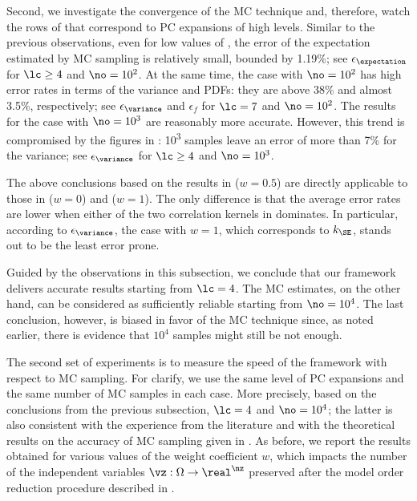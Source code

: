 Second, we investigate the convergence of the \ac{MC} technique and, therefore,
watch the rows of  that correspond to \ac{PC}
expansions of high levels. Similar to the previous observations, even for low
values of \no, the error of the expectation estimated by \ac{MC} sampling is
relatively small, bounded by 1.19\%; see $\epsilon_{\expectation}$ for $\lc
\geq 4$ and $\no = 10^2$. At the same time, the case with $\no = 10^2$ has high
error rates in terms of the variance and \acp{PDF}: they are above 38\% and
almost 3.5\%, respectively; see $\epsilon_{\variance}$ and $\epsilon_f$ for
$\lc = 7$ and $\no = 10^2$. The results for the case with $\no = 10^3$ are
reasonably more accurate. However, this trend is compromised by the figures in
: 10\textsuperscript{3} samples leave an error of more
than 7\% for the variance; see $\epsilon_{\variance}$ for $\lc \geq 4$ and $\no
= 10^3$.

The above conclusions based on the results in  ($w =
0.5$) are directly applicable to those in  ($w = 0$) and
 ($w = 1$). The only difference is that the average
error rates are lower when either of the two correlation kernels in
 dominates. In particular, according to
$\epsilon_{\variance}$, the case with $w = 1$, which corresponds to $k_\SE$,
stands out to be the least error prone.

Guided by the observations in this subsection, we conclude that our framework
delivers accurate results starting from $\lc = 4$. The \ac{MC} estimates, on
the other hand, can be considered as sufficiently reliable starting from $\no =
10^4$. The last conclusion, however, is biased in favor of the \ac{MC}
technique since, as noted earlier, there is evidence that $10^4$ samples might
still be not enough.


The second set of experiments is to measure the speed of the framework with
respect to \ac{MC} sampling. For clarify, we use the same level of \ac{PC}
expansions and the same number of \ac{MC} samples in each case. More precisely,
based on the conclusions from the previous subsection, $\lc = 4$ and $\no =
10^4$; the latter is also consistent with the experience from the literature
\cite{ghanta2006, bhardwaj2008, huang2009a, shen2009, lee2013} and with the
theoretical results on the accuracy of \ac{MC} sampling given in
\cite{diaz-emparanza2002}. As before, we report the results obtained for various
values of the weight coefficient $w$, which impacts the number of the
independent variables $\vz: \Omega \to \real^\nz$ preserved after the model
order reduction procedure described in .

